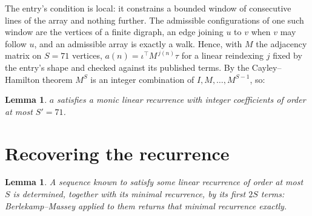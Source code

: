 \documentclass[11pt,a4paper]{article}
\theoremstyle{plain}
\newtheorem{lemma}[theorem]{Lemma}
\theoremstyle{definition}
\begin{document}
The entry's condition is local: it constrains a bounded window of consecutive lines of the
array and nothing further. The admissible configurations of one such window are the vertices
of a finite digraph, an edge joining $u$ to $v$ when $v$ may follow $u$, and an admissible
array is exactly a walk. Hence, with $M$ the adjacency matrix on $S=71$ vertices,
$a(n)=\iota^{\!\top}M^{\,j(n)}\tau$ for a linear reindexing $j$ fixed by the entry's shape
and checked against its published terms. By the Cayley--Hamilton theorem $M^{S}$ is an
integer combination of $I,M,\dots,M^{S-1}$, so:

\begin{lemma}\label{lem:cf}
$a$ satisfies a monic linear recurrence with integer coefficients of order at most
$S'=71$.
\end{lemma}

\section{Recovering the recurrence}

\begin{lemma}\label{lem:bm}
A sequence known to satisfy some linear recurrence of order at most $S$ is determined, together
with its minimal recurrence, by its first $2S$ terms: Berlekamp--Massey applied to them returns
that minimal recurrence exactly.
\end{lemma}
\end{document}

